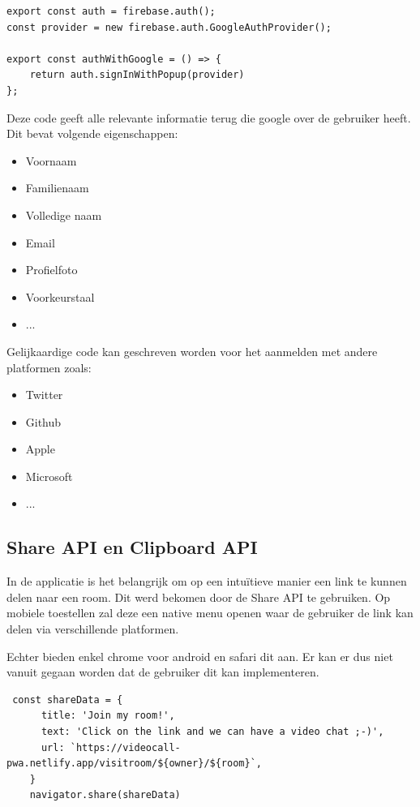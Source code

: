 		
\begin{lstlisting}
export const auth = firebase.auth();
const provider = new firebase.auth.GoogleAuthProvider();

export const authWithGoogle = () => {
	return auth.signInWithPopup(provider)
};
\end{lstlisting}
	
		Deze code geeft alle relevante informatie terug die google over de gebruiker heeft. Dit bevat volgende eigenschappen:
		\begin{itemize}
			\item Voornaam
			\item Familienaam
			\item Volledige naam
			\item Email
			\item Profielfoto
			\item Voorkeurstaal
			\item ...
		\end{itemize} 
		
		Gelijkaardige code kan geschreven worden voor het aanmelden met andere platformen zoals:
		\begin{itemize}
			\item Twitter
			\item Github
			\item Apple
			\item Microsoft
			\item ...
		\end{itemize} 
		
	\subsection{Share API en Clipboard API}
	
		In de applicatie is het belangrijk om op een intuïtieve manier een link te kunnen delen naar een room. 
		Dit werd bekomen door de Share API te gebruiken.
		Op mobiele toestellen zal deze een native menu openen waar de gebruiker de link kan delen via verschillende platformen.
		
		Echter bieden enkel chrome voor android en safari dit aan. Er kan er dus niet vanuit gegaan worden dat de gebruiker dit kan implementeren.

\begin{lstlisting}
 const shareData = {
      title: 'Join my room!',
      text: 'Click on the link and we can have a video chat ;-)',
      url: `https://videocall-pwa.netlify.app/visitroom/${owner}/${room}`,
    }
    navigator.share(shareData)
\end{lstlisting}

